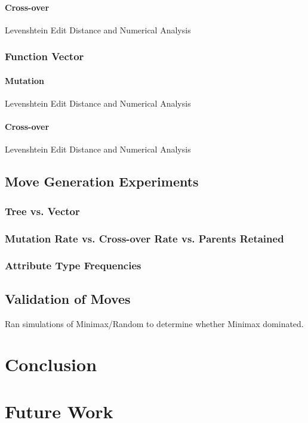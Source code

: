 \documentclass{acm_proc_article-sp}
\begin{document}
\paragraph{Cross-over}
Levenshtein Edit Distance and Numerical Analysis
\subsubsection{Function Vector}
\paragraph{Mutation}
Levenshtein Edit Distance and Numerical Analysis
\paragraph{Cross-over}
Levenshtein Edit Distance and Numerical Analysis

\subsection{Move Generation Experiments}

\subsubsection{Tree vs. Vector}
\subsubsection{Mutation Rate vs. Cross-over Rate vs. Parents Retained}
\subsubsection{Attribute Type Frequencies}

\subsection{Validation of Moves}

Ran simulations of Minimax/Random to determine whether Minimax dominated.

\section{Conclusion}


\section{Future Work}
\end{document}
